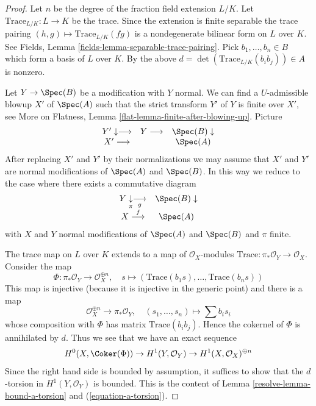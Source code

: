 \begin{proof}

Let $n$ be the degree of the fraction field extension $L/K$.
Let $\text{Trace}_{L/K} : L \to K$ be the trace. Since the extension is finite
separable the trace pairing $(h, g) \mapsto \text{Trace}_{L/K}(fg)$
is a nondegenerate bilinear form on $L$ over $K$. See
Fields, Lemma \ref{fields-lemma-separable-trace-pairing}.
Pick $b_1, \ldots, b_n \in B$ which form a basis of $L$ over $K$.
By the above $d = \det(\text{Trace}_{L/K}(b_ib_j)) \in A$ is nonzero.

\medskip\noindent
Let $Y \to \Spec(B)$ be a modification with $Y$ normal. We can find
a $U$-admissible blowup $X'$ of $\Spec(A)$ such that the strict transform
$Y'$ of $Y$ is finite over $X'$, see More on Flatness, Lemma
\ref{flat-lemma-finite-after-blowing-up}. Picture
$$
\begin{array}{ccc}Y' \downarrow\longrightarrow & Y \longrightarrow & \Spec(B) \downarrow \\ X' \longrightarrow &  & \Spec(A)\end{array}
$$
After replacing $X'$ and $Y'$ by their normalizations we may assume that
$X'$ and $Y'$ are normal modifications of $\Spec(A)$ and $\Spec(B)$.
In this way we reduce to the case where there exists a commutative diagram
$$
\begin{array}{cc}Y \underset{\pi}{\downarrow}\underset{g}{\longrightarrow} & \Spec(B) \downarrow \\ X \overset{f}{\longrightarrow} & \Spec(A)\end{array}
$$
with $X$ and $Y$ normal modifications of $\Spec(A)$ and $\Spec(B)$ and
$\pi$ finite.

\medskip\noindent
The trace map on $L$ over $K$ extends to a map of $\mathcal{O}_X$-modules
$\text{Trace} : \pi_*\mathcal{O}_Y \to \mathcal{O}_X$. Consider the map
$$
\Phi : \pi_*\mathcal{O}_Y \longrightarrow \mathcal{O}_X^{\oplus n},\quad
s \longmapsto (\text{Trace}(b_1s), \ldots, \text{Trace}(b_ns))
$$
This map is injective (because it is injective in the generic point)
and there is a map
$$
\mathcal{O}_X^{\oplus n} \longrightarrow \pi_*\mathcal{O}_Y,\quad
(s_1, \ldots, s_n) \longmapsto \sum b_i s_i
$$
whose composition with $\Phi$ has matrix $\text{Trace}(b_ib_j)$.
Hence the cokernel of $\Phi$ is annihilated by $d$. Thus we see that
we have an exact sequence
$$
H^0(X, \Coker(\Phi)) \to H^1(Y, \mathcal{O}_Y) \to
H^1(X, \mathcal{O}_X)^{\oplus n}
$$
Since the right hand side is bounded by assumption, it suffices to show
that the $d$-torsion in $H^1(Y, \mathcal{O}_Y)$ is bounded.
This is the content of Lemma \ref{resolve-lemma-bound-a-torsion} and
(\ref{equation-a-torsion}).
\end{proof}

